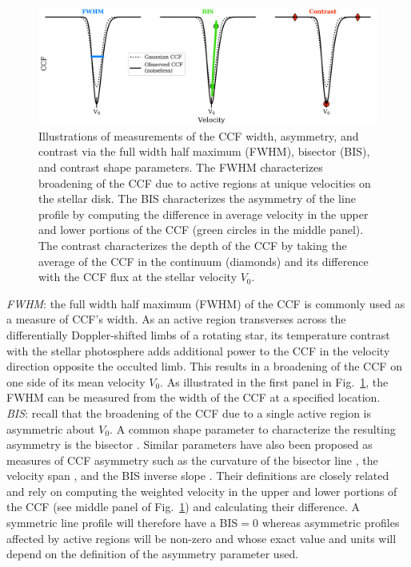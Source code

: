 \begin{figure}
  \centering
  \includegraphics[width=\hsize]{figures/ccf.png}
  \caption[Illustrations of CCF shape parameters.]
          {Illustrations of measurements of the CCF width, asymmetry, and contrast via the full
            width half maximum (FWHM), bisector (BIS), and contrast shape parameters. The FWHM
            characterizes broadening of the CCF due to active regions at unique velocities on the
            stellar disk. The
            BIS characterizes the asymmetry of the line profile by computing the difference in
            average velocity in the upper and lower portions of the CCF (green circles in the
            middle panel). The contrast characterizes the depth of the CCF by taking the average
            of the CCF in the continuum (diamonds) and its difference with the CCF flux at the
            stellar velocity $V_0$.}
  \label{fig:ccf}
\end{figure}

\emph{FWHM}:
the full width half maximum (FWHM) of the CCF is commonly used as a measure of CCF's
width. As an active region transverses across the differentially
Doppler-shifted limbs of a rotating star,
its temperature contrast with the stellar photosphere adds additional
power to the CCF in the velocity direction opposite the occulted limb. This results in a
broadening of the CCF on one side of its mean velocity $V_0$. As illustrated in
the first panel in Fig.~\ref{fig:ccf},
the FWHM can be measured from the width of the CCF at a specified location. \\

\emph{BIS}:
recall that the broadening of the CCF due to a single active region is asymmetric about $V_0$.
A common shape parameter to characterize the resulting asymmetry is the bisector
\citep[BIS;][]{queloz01}.
Similar parameters have also been proposed as measures of CCF asymmetry such as the curvature of
the bisector line \citep{hatzes96}, the velocity span \citep{boisse11}, and the BIS inverse
slope \citep{queloz01}. Their definitions are closely related and rely on computing the weighted
velocity in the upper and lower portions of the CCF (see middle panel of Fig.~\ref{fig:ccf})
and calculating their difference. A symmetric line profile will therefore have a BIS$=0$ whereas
asymmetric profiles affected by active regions will be non-zero and whose exact value and units
will depend on the definition of the asymmetry parameter used. \\


